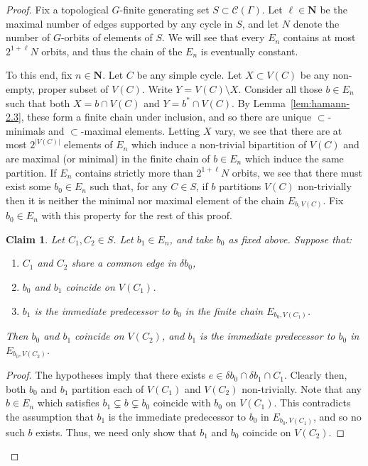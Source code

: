 \documentclass[11pt,a4paper]{amsart}
\newcommand{\N}{\mathbf{N}}
\newtheorem{claim}[theorem]{Claim}
\theoremstyle{definition}
\newcommand{\cyc}{\mathscr{C}}
\begin{document}
\begin{proof}
    Fix a topological $G$-finite generating set $S \subset \cyc (\Gamma)$. Let $\ell \in \N$ be the maximal number of edges supported by any cycle in $S$, and let $N$ denote the number of $G$-orbits of elements of $S$.  
    We will see that every $ E _n$ contains at most 
    $2^{1+\ell} N$ orbits, 
    and thus the chain of the $ E _n$ is eventually constant. 
    
    To this end, fix $n \in \N$. Let $C$ be any simple cycle. Let $X \subset V(C)$ be any non-empty, proper subset of $V(C)$. Write $Y = V(C) \setminus X$. Consider all those $b \in  E _n$ such that both $X = b \cap V(C)$ and $Y = b^\ast \cap V(C)$. By Lemma~\ref{lem:hamann-2.3}, these form a finite chain under inclusion, and so there are unique $\subset$-minimals and $\subset$-maximal elements. Letting $X$ vary, we see that there are at most $2^{|V(C)|}$ elements of $ E _n$ which induce a non-trivial bipartition of $V(C)$ and are maximal (or minimal) in the finite chain of $b \in  E _n$ which induce the same partition. If $ E _n$ contains strictly more than $2^{1+\ell} N$ orbits, we see that there must exist some $b_0 \in  E _n$ such that, 
    for any $C \in  S $, if $b$ partitions $V(C)$ non-trivially then it is neither the minimal nor maximal element of the chain $ E _{b,V(C)}$. Fix $b_0 \in  E _n$ with this property for the rest of this proof.


    \begin{claim}\label{claim:hamann-claim}
        Let $C_1, C_2 \in  S $. Let $b_1 \in  E _n$, and take $b_0$ as fixed above. Suppose that:
        \begin{enumerate}
            \item $C_1$ and $C_2$ share a common edge in $\delta b_0$, 

            \item $b_0$ and $b_1$ coincide on $V(C_1)$.

            \item $b_1$ is the immediate predecessor to $b_0$ in the finite chain $ E _{b_0,V(C_1)}$.
        \end{enumerate} 
        Then $b_0$ and $b_1$ coincide on $V(C_2)$, and $b_1$ is the immediate predecessor to $b_0$ in $ E _{b_0,V(C_2)}$. 
    \end{claim}

    \begin{proof}
        The hypotheses imply that there exists $e \in \delta b_0 \cap \delta b_1 \cap C_1$. Clearly then, both $b_0$ and $b_1$ partition each of $V(C_1)$ and $V(C_2)$ non-trivially. Note that any $b \in  E _n$ which satisfies $b_1 \subsetneq b \subsetneq b_0$ coincide with $b_0$ on $V(C_1)$. This contradicts the assumption that $b_1$ is the immediate predecessor to $b_0$ in $ E _{b_0,V(C_1)}$, and so no such $b$ exists. Thus, we need only show that $b_1$ and $b_0$ coincide on $V(C_2)$. 


\end{proof}
\end{proof}
\end{document}
